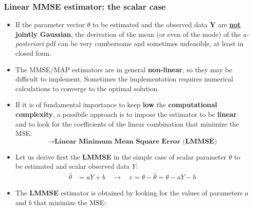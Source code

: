 \subsubsection{Linear MMSE estimator: the scalar case}
\begin{itemize}
\item If the parameter vector \(\theta\) to be estimated and the observed data \textbf{Y} are \underline{\textbf{not}} \textbf{jointly Gaussian}, the derivation of the mean (or even of the mode) of the \textit{a-posteriori} pdf can be very cumbersome and sometimes unfeasible, at least in closed form.
\item The MMSE/MAP estimators are in general \textbf{non-linear}, so they may be difficult to implement. Sometimes the implementation requires numerical calculations to converge to the optimal solution.
\item If it is of fundamental importance to keep \textbf{low} the \textbf{computational complexity}, a possibile approach is to impose the estimator to be \textbf{linear} and to look for the coefficients of the linear combination that minimize the MSE:
\[
\rightarrow \textbf{Linear Minimum Mean Square Error (LMMSE)}
\]

\item Let us derive first the \textbf{LMMSE} in the simple case of scalar parameter \(\theta\) to be estimated and scalar observed data \(Y\):
\begin{align*}
\hat{\theta}&=aY+b \quad \rightarrow \quad \varepsilon=\theta-\hat{\theta}=\theta-aY-b
\end{align*}

\item The \textbf{LMMSE} estimator is obtained by looking for the values of parameters \(a\) and \(b\) that minimize the MSE:


\end{itemize}
